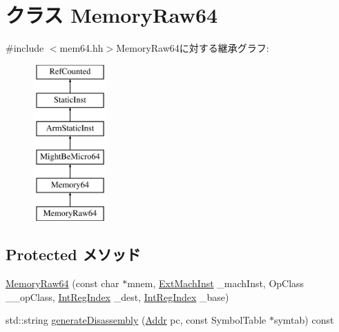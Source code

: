 \hypertarget{classArmISA_1_1MemoryRaw64}{
\section{クラス MemoryRaw64}
\label{classArmISA_1_1MemoryRaw64}
}


{\ttfamily \#include $<$mem64.hh$>$}MemoryRaw64に対する継承グラフ:\begin{figure}[H]
\begin{center}
\leavevmode
\includegraphics[height=6cm]{classArmISA_1_1MemoryRaw64}
\end{center}
\end{figure}
\subsection*{Protected メソッド}
\begin{DoxyCompactItemize}
\item 
\hyperlink{classArmISA_1_1MemoryRaw64_a03756ab9aa27dce182b70468c4b3d623}{MemoryRaw64} (const char $\ast$mnem, \hyperlink{classStaticInst_a5605d4fc727eae9e595325c90c0ec108}{ExtMachInst} \_\-machInst, OpClass \_\-\_\-opClass, \hyperlink{namespaceArmISA_ae64680ba9fb526106829d6bf92fc791b}{IntRegIndex} \_\-dest, \hyperlink{namespaceArmISA_ae64680ba9fb526106829d6bf92fc791b}{IntRegIndex} \_\-base)
\item 
std::string \hyperlink{classArmISA_1_1MemoryRaw64_a95d323a22a5f07e14d6b4c9385a91896}{generateDisassembly} (\hyperlink{classm5_1_1params_1_1Addr}{Addr} pc, const SymbolTable $\ast$symtab) const 
\end{DoxyCompactItemize}


